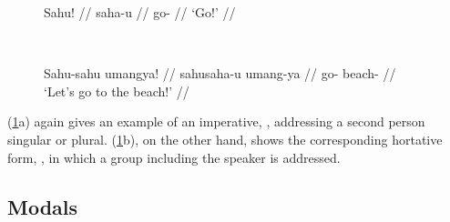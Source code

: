 \begin{figure}[h]
\ex{}\label{ex:hortmorph}
\begin{minipage}[t]{.5\remaining}
\tl\quad\begingl
	\gla Sahu! //
	\glb saha-u //
	\glc go-\Imp{} //
	\glft `Go!' //
\endgl
\end{minipage}
~
\begin{minipage}[t]{.5\remaining}
\tl\quad\begingl
	\gla Sahu-sahu umangya! //
	\glb sahu\til{}saha-u umang-ya //
	\glc \Hort{}\til{}go-\Imp{} beach-\Loc{} //
	\glft `Let's go to the beach!' //
\endgl
\end{minipage}
\xe
\end{figure}

(\ref{ex:hortmorph}a) again gives an example of an imperative,
, addressing a second person singular or plural.
(\ref{ex:hortmorph}b), on the other hand, shows the corresponding hortative
form, , in which a group including the speaker is
addressed.



\subsection{Modals}
\label{subsec:modals}

